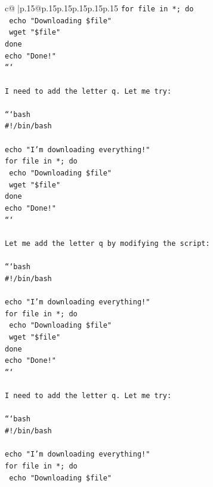 \documentclass{article}
\begin{document}
{\begin{supertabular}{c@{$\;$}|p{.15\linewidth}@{}p{.15\linewidth}p{.15\linewidth}p{.15\linewidth}p{.15\linewidth}p{.15\linewidth}}
{{{\texttt{for file in *; do} \\
\texttt{    echo "Downloading \$file"} \\
\texttt{    wget "\$file"} \\
\texttt{done} \\
\texttt{echo "Done!"} \\
\texttt{```} \\
\\ 
\texttt{I need to add the letter q. Let me try:} \\
\\ 
\texttt{```bash} \\
\texttt{\#!/bin/bash} \\
\\ 
\texttt{echo "I'm downloading everything!"} \\
\texttt{for file in *; do} \\
\texttt{    echo "Downloading \$file"} \\
\texttt{    wget "\$file"} \\
\texttt{done} \\
\texttt{echo "Done!"} \\
\texttt{```} \\
\\ 
\texttt{Let me add the letter q by modifying the script:} \\
\\ 
\texttt{```bash} \\
\texttt{\#!/bin/bash} \\
\\ 
\texttt{echo "I'm downloading everything!"} \\
\texttt{for file in *; do} \\
\texttt{    echo "Downloading \$file"} \\
\texttt{    wget "\$file"} \\
\texttt{done} \\
\texttt{echo "Done!"} \\
\texttt{```} \\
\\ 
\texttt{I need to add the letter q. Let me try:} \\
\\ 
\texttt{```bash} \\
\texttt{\#!/bin/bash} \\
\\ 
\texttt{echo "I'm downloading everything!"} \\
\texttt{for file in *; do} \\
\texttt{    echo "Downloading \$file"} \\
}}}
\end{supertabular}}
\end{document}
